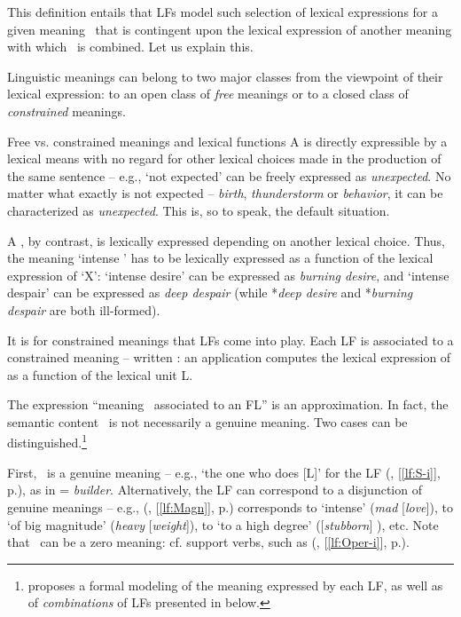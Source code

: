 This definition entails that LFs model such selection of lexical expressions for a given meaning \sigmaF\ that is contingent upon the lexical expression of another meaning with which \sigmaF\ is combined. Let us explain this.

Linguistic meanings can belong to two major classes from the viewpoint of their lexical expression: to an open class of \emph{free} meanings or to a closed class of \emph{constrained} meanings.

\begin{soundbox}{Free vs. constrained meanings and lexical functions}
A  is directly expressible by a lexical means with no regard for other lexical choices made in the production of the same sentence -- e.g., `not expected' can be freely expressed as \textit{unexpected}. No matter what exactly is not expected -- \textit{birth}, \textit{thunderstorm} or \textit{behavior}, it can be characterized as \textit{unexpected}. This is, so to speak, the default situation.

A \label{txt:constrainedMeaning}, by contrast, is lexically expressed depending on another lexical choice. Thus, the meaning `intense ' has to be lexically expressed as a function of the lexical expression of `X': `intense desire' can be expressed as \textit{burning desire}, and `intense despair' can be expressed as \textit{deep despair} (while *\textit{deep desire} and *\textit{burning despair} are both ill-formed).

It is for constrained meanings that LFs come into play. Each LF  is associated to a constrained meaning -- written \sigmaF: an application  computes the lexical expression of \sigmaF as a function of the lexical unit L.
\end{soundbox}

The expression ``meaning \sigmaF\ associated to an FL'' is an approximation. In fact, the semantic content \sigmaF\ is not necessarily a genuine meaning. Two cases can be distinguished.\footnote{\textcite{KahanePolguere2001-e} proposes a formal modeling of the meaning expressed by each LF, as well as of \emph{combinations} of LFs  presented in  below.}

First, \sigmaF\ is a genuine meaning -- e.g., `the one who does [L]' for the LF  (, [\ref{lf:S-i}], p.\thinspace\pageref{lf:S-i}), as in  = \textit{builder}. Alternatively, the LF can correspond to a disjunction of genuine meanings -- e.g.,  (, [\ref{lf:Magn}], p.\thinspace\pageref{lf:Magn}) corresponds to `intense' (\textit{mad} [\textit{love}]), to `of big magnitude' (\textit{heavy} [\textit{weight}]), to `to a high degree' ([\textit{stubborn}] ), etc. Note that \sigmaF\ can be a zero meaning: cf. support verbs, such as  (, [\ref{lf:Oper-i}], p.\thinspace\pageref{lf:Oper-i}).

